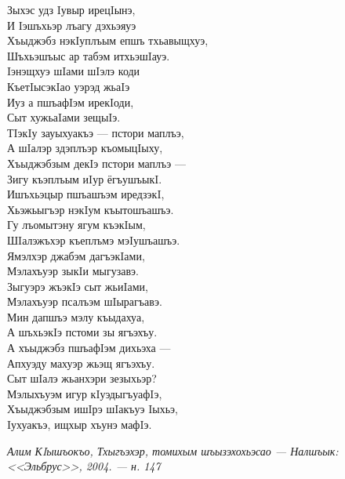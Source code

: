 \begin{multicols}{2}
Зыхэс удз Iувыр ирецIынэ,\\
И Iэшъхьэр лъагу дэхьэяуэ \\
Хъыджэбз нэкIуплъым епшъ тхьавыщхуэ,\\
Шъхьэшъыс ар табэм итхьэшIауэ. \medskip\\
Iэнэщхуэ шIами шIэлэ коди\\
КъетIысэкIао уэрэд жьаIэ\\
Иуз а пшъафIэм ирекIоди,\\
Сыт хужьаIами зещыIэ.\medskip\\
ТIэкIу зауыхуакъэ  --- пстори маплъэ, \\
А шIалэр здэплъэр къомыцIыху, \\
Хъыджэбзым декIэ пстори маплъэ --- \\
Зигу къэплъым иIур ёгъушъыкI. \medskip\\
Ишъхьэцыр пшъашъэм иредзэкI,\\
Хьэжьыгъэр нэкIум къытошъашъэ.\\
Гу лъомытэну ягум къэкIым,\\
ШIалэжъхэр къеплъмэ мэIушъашъэ.\medskip\\
Ямэлхэр джабэм дагъэкIами,\\
Мэлахъуэр зыкIи мыгузавэ.\\
Зыгуэрэ жъэкIэ сыт жьиIами,\\
Мэлахъуэр псалъэм шIырагъавэ.\medskip\\
Мин дапшъэ мэлу къыдахуа,\\
А шъхьэкIэ пстоми зы ягъэхъу.\\
А хъыджэбз пшъафIэм дихьэха --- \\
Апхуэду махуэр жьэщ ягъэхъу. \medskip\\
Сыт шIалэ жьанхэри зезыхьэр?\\
Мэлыхъуэм игур кIуэдыгъуафIэ,\\
Хъыджэбзым ишIрэ шIакъуэ Iыхьэ,\\
Iухуакъэ, ищхыр хъунэ мафIэ.\\
\end{multicols}
\textit{Алим КIышъокъо, Тхыгъэхэр, томихым шъызэхохьэсао ---  Налшъык: <<Эльбрус>>, 2004. --- н. 147}
\pagebreak